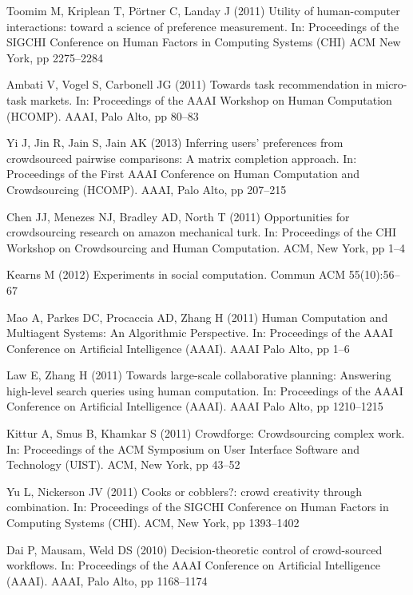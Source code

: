 \documentclass[11pt]{bmc_article_s50}
\begin{document}
\begin{thebibliography}{000}
Toomim M,
Kriplean T,
P\"{o}rtner C,
Landay J (2011)
{Utility of human-computer interactions: toward a science of preference
  measurement}.
In: {Proceedings of the SIGCHI Conference on Human Factors in Computing
  Systems (CHI)}
{ACM}
{New York},
pp 2275--{2284}

Ambati V,
Vogel S,
Carbonell JG (2011)
{Towards task recommendation in micro-task markets.}
In: {Proceedings of the AAAI Workshop on Human Computation (HCOMP)}.
{AAAI},
{Palo Alto},
pp 80--{83}

Yi J,
Jin R,
Jain S,
Jain AK (2013)
{Inferring users' preferences from crowdsourced pairwise comparisons: A
  matrix completion approach}.
In: {Proceedings of the First AAAI Conference on Human Computation and
  Crowdsourcing (HCOMP)}.
{AAAI},
{Palo Alto}, pp 207--{215}


Chen JJ,
Menezes NJ,
Bradley AD,
North T (2011)
{Opportunities for crowdsourcing research on amazon mechanical turk}.
In: {Proceedings of the CHI Workshop on Crowdsourcing and Human Computation}.
{ACM},
{New York}, pp 1--{4}

Kearns M (2012)
{Experiments in social computation}.
{Commun ACM}
{55}(10):56--{67}



Mao A,
Parkes DC,
Procaccia AD,
Zhang H (2011)
{{Human Computation and Multiagent Systems: An Algorithmic
  Perspective}}.
In: {Proceedings of the AAAI Conference on Artificial Intelligence
  (AAAI)}.
{AAAI}
{Palo Alto},
pp 1--{6}


Law E,
Zhang H (2011)
{Towards large-scale collaborative planning: Answering high-level
  search queries using human computation}.
In: {Proceedings of the AAAI Conference on Artificial Intelligence
  (AAAI)}.
{AAAI}
{Palo Alto}, pp 1210--{1215}


Kittur A,
Smus B,
Khamkar S (2011)
{{Crowdforge: Crowdsourcing complex work}}.
In: {Proceedings of the ACM Symposium on User Interface Software and
  Technology (UIST)}.
{ACM},
{New York}, pp 43--{52}


Yu L,
Nickerson JV (2011)
{Cooks or cobblers?: crowd creativity through combination}.
In: {Proceedings of the SIGCHI Conference on Human Factors in Computing
  Systems (CHI)}.
{ACM},
{New York},
pp 1393--{1402}

Dai P,
Mausam,
Weld DS (2010)
{{Decision-theoretic control of crowd-sourced workflows}}.
In: {Proceedings of the AAAI Conference on Artificial Intelligence
  (AAAI)}.
{AAAI},
{Palo Alto,} pp 1168--{1174}



\end{thebibliography}
\end{document}
